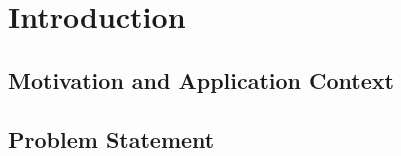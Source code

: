 \chapter{Introduction}
\label{chap:introduction}

\section{Motivation and Application Context}
\label{sec:intro:motivation}

\section{Problem Statement}
\label{sec:intro:problem}

